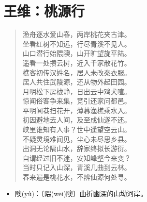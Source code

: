 \documentclass[12pt,oneside]{book}
\newenvironment{shici}{
\begin{verse}
\centering\large\hspace{12pt}}
{\end{verse}}
\begin{document}
\chapter{王维：桃源行}
\begin{shici}
渔舟逐水爱山春，两岸桃花夹古津。\\
坐看红树不知远，行尽青溪不见人。\\
山口潜行始隈隩，山开旷望旋平陆。\\
遥看一处攒云树，近入千家散花竹。\\
樵客初传汉姓名，居人未改秦衣服。\\
居人共住武陵源，还从物外起田园。\\
月明松下房栊静，日出云中鸡犬喧。\\
惊闻俗客争来集，竞引还家问都邑。\\
平明闾巷扫花开，薄暮渔樵乘水入。\\
初因避地去人间，及至成仙遂不还。\\
峡里谁知有人事？世中遥望空云山。\\
不疑灵境难闻见，尘心未尽思乡县。\\
出洞无论隔山水，辞家终拟长游衍。\\
自谓经过旧不迷，安知峰壑今来变？\\
当时只记入山深，青溪几曲到云林。\\
春来遍是桃花水，不辨仙源何处寻。
\end{shici}

\begin{itemize}
\item 隩(yù)：〔隈(wēi)隩〕曲折幽深的山坳河岸。
\end{itemize}
\end{document}
